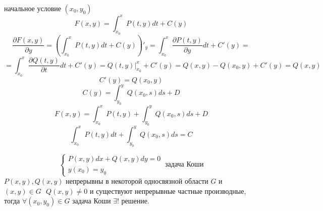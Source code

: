 \begin{block}
  начальное условие $(x_0, y_0)$
  $$
  F(x, y) = \int_{x_0}^x P(t, y)dt + C(y)
  $$
  $$
  \frac{\partial F(x, y)}{\partial y} =
  \left( \int_{x_0}^x P(t, y)dt + C(y) \right)'_y =
  \int_{x_0}^x \frac{\partial P(t, y)}{\partial y} dt + C'(y) =
  $$
  $$
  = \int_{x_0}^x \frac{\partial Q(t, y)}{\partial t} dt + C'(y) =
  Q(t, y)|_{x_0}^x + C'(y) = Q(x, y) - Q(x_0, y) + C'(y) = Q(x, y)
  $$
  $$
  C'(y) = Q(x_0, y)
  $$
  $$
  C(y) = \int_{y_0}^y Q(x_0, s) ds + D
  $$
  $$
  F(x, y) = \int_{x_0}^x P(t, y) + \int_{y_0}^y Q(x_0, s) ds + D
  $$
  $$
  \int_{x_0}^x P(t, y)dt + \int_{y_0}^y Q(x_0, s) ds = C
  $$
\end{block}

\begin{theorem}
  $$
  \left\{
  \begin{array}{l}
    P(x,y)dx + Q(x,y)dy = 0 \\
    y(x_0) = y_0
  \end{array}
  \right. ~ \text{задача Коши}
  $$
  $P(x, y), Q(x, y)$ непрерывны в некоторой односвязной области $G$ и
  $(x,y) \in G ~~~ Q(x, y) \not= 0$ и существуют непрерывные частные
  производные, тогда $\forall (x_0, y_0) \in G$ задача Коши
  $\exists !$ решение.
\end{theorem}
